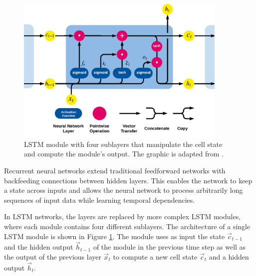 \begin{figure}[htbp!]
	\centering
	\includegraphics[width=0.9\textwidth]{figures/lstm-module}
	\caption[Structure of an LSTM module]{LSTM module with four sublayers that manipulate the cell state and compute the module’s output. The graphic is adapted from \cite{lstm-blog}.}
	\label{fig:lstm-module}
\end{figure}

Recurrent neural networks extend traditional feedforward networks with backfeeding connections between hidden layers.
This enables the network to keep a state across inputs and allows the neural network to process arbitrarily long sequences of input data while learning temporal dependencies.

In LSTM networks, the layers are replaced by more complex LSTM modules, where each module contains four different sublayers.
The architecture of a single LSTM module is shown in Figure \ref{fig:lstm-module}.
The module uses as input the state $\vec{c}_{t-1}$ and the hidden output $\vec{h}_{t-1}$ of the module in the previous time step as well as the output of the previous layer $\vec{x}_t$ to compute a new cell state $\vec{c}_{t}$ and a hidden output $\vec{h}_{t}$.

